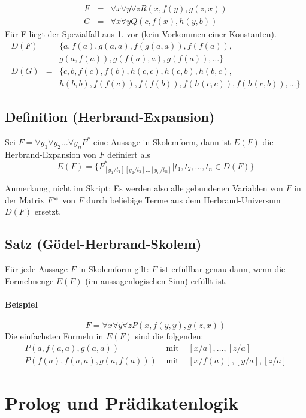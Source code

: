 \documentclass[a4paper,twoside,DIV15,BCOR12mm]{scrbook}
\begin{document}
\begin{eqnarray*}
	F & = &\forall x\forall y\forall zR(x,f(y),g(z,x)) \\
	G & = & \forall x\forall yQ(c,f(x),h(y,b))
\end{eqnarray*}
Für F liegt der Spezialfall aus 1. vor (kein Vorkommen einer Konstanten).
\begin{eqnarray*}
D(F) & = & \{a,f(a),g(a,a),f(g(a,a)),f(f(a)),\\
& & g(a,f(a)),g(f(a),a),g(f(a)),\ldots\}\\
D(G) & = & \{c,b,f(c),f(b),h(c,c),h(c,b),h(b,c),\\
& & h(b,b),f(f(c)),f(f(b)),f(h(c,c)),f(h(c,b)),\ldots\}
\end{eqnarray*}


\subsection{Definition (Herbrand-Expansion)}
 Sei $F=\forall y_1 \forall y_2 \ldots \forall y_n F^*$ eine Aussage in Skolemform,
dann ist $E(F)$ die Herbrand-Expansion von $F$ definiert als
$$E(F)=\{F^*_{[y_1/t_1][y_2/t_2]\ldots[y_n/t_n]} | t_1,t_2, \ldots, t_n \in D(F) \}$$

Anmerkung, nicht im Skript: Es werden also alle gebundenen Variablen von $F$ in der Matrix $F*$ von $F$ durch beliebige Terme aus dem Herbrand-Universum $D(F)$ ersetzt.

\subsection{Satz (Gödel-Herbrand-Skolem)}
Für jede Aussage $F$ in Skolemform gilt:
$F$ ist erfüllbar genau dann, wenn die Formelmenge $E(F)$ (im aussagenlogischen Sinn) erfüllt ist.

\paragraph{Beispiel}
$$F=\forall x \forall y \forall z P(x,f(y,y), g(z,x))$$
Die einfachsten Formeln in $E(F)$ sind die folgenden:
\begin{eqnarray*}
	P(a,f(a,a), g(a,a)) & \text{ mit } & [x/a], \ldots, [z/a]\\
	P(f(a), f(a,a), g(a,f(a)))& \text{ mit } &[x/f(a)], [y/a], [z/a]
\end{eqnarray*}

\section{Prolog und Prädikatenlogik}
\end{document}
